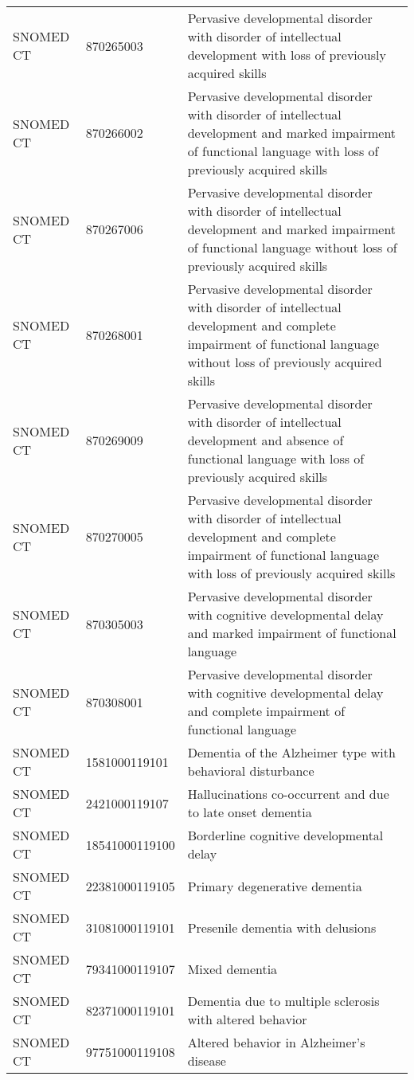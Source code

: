 \begin{longtable}{p{}p{}p{}}
  SNOMED CT & 870265003 & Pervasive developmental disorder with disorder of intellectual development with loss of previously acquired skills \\ 
  SNOMED CT & 870266002 & Pervasive developmental disorder with disorder of intellectual development and marked impairment of functional language with loss of previously acquired skills \\ 
  SNOMED CT & 870267006 & Pervasive developmental disorder with disorder of intellectual development and marked impairment of functional language without loss of previously acquired skills \\ 
  SNOMED CT & 870268001 & Pervasive developmental disorder with disorder of intellectual development and complete impairment of functional language without loss of previously acquired skills \\ 
  SNOMED CT & 870269009 & Pervasive developmental disorder with disorder of intellectual development and absence of functional language with loss of previously acquired skills \\ 
  SNOMED CT & 870270005 & Pervasive developmental disorder with disorder of intellectual development and complete impairment of functional language with loss of previously acquired skills \\ 
  SNOMED CT & 870305003 & Pervasive developmental disorder with cognitive developmental delay and marked impairment of functional language \\ 
  SNOMED CT & 870308001 & Pervasive developmental disorder with cognitive developmental delay and complete impairment of functional language \\ 
  SNOMED CT & 1581000119101 & Dementia of the Alzheimer type with behavioral disturbance \\ 
  SNOMED CT & 2421000119107 & Hallucinations co-occurrent and due to late onset dementia \\ 
  SNOMED CT & 18541000119100 & Borderline cognitive developmental delay \\ 
  SNOMED CT & 22381000119105 & Primary degenerative dementia \\ 
  SNOMED CT & 31081000119101 & Presenile dementia with delusions \\ 
  SNOMED CT & 79341000119107 & Mixed dementia \\ 
  SNOMED CT & 82371000119101 & Dementia due to multiple sclerosis with altered behavior \\ 
  SNOMED CT & 97751000119108 & Altered behavior in Alzheimer's disease \\ 

\end{longtable}
